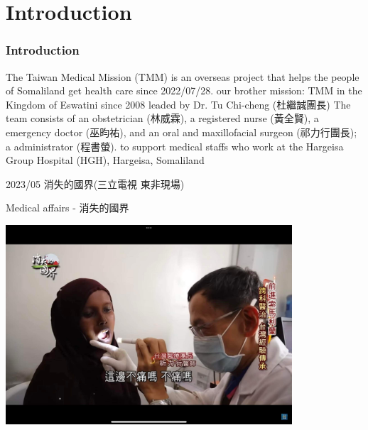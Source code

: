 \documentclass[aspectratio=169]{beamer}
\begin{document}
\section{Introduction}
\begin{frame}
\frametitle{Introduction}
\begin{outline}
    

\1 The Taiwan Medical Mission (TMM) is an overseas project that helps the people of Somaliland get health care since 2022/07/28.
    \2 our brother mission: TMM in the Kingdom of Eswatini since 2008 leaded by Dr. Tu Chi-cheng (杜繼誠團長)
\1 The team consists of 
    \2 an obstetrician (林威霖), a registered nurse (黃全賢), a emergency doctor (巫昀祐), and an oral and maxillofacial surgeon (祁力行團長); a administrator (程書螢). 
    \2 to support medical staffs who work at the Hargeisa Group Hospital (HGH), Hargeisa, Somaliland



\end{outline}

2023/05 消失的國界(三立電視 東非現場)

\end{frame}


\begin{frame}{Medical affairs - 消失的國界}
    \begin{center}
        \includegraphics[width=0.8\textwidth]{IMG_4940(1).jpeg}

    \end{center}
\end{frame}
\end{document}
